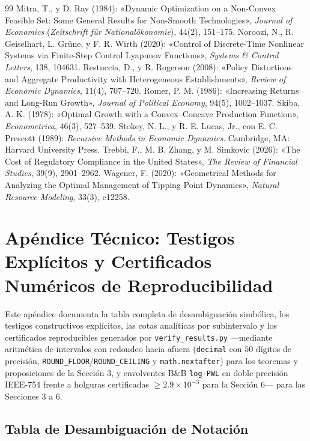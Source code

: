 \documentclass[11pt,letterpaper]{article}
\theoremstyle{plain}
\begin{document}
\begin{thebibliography}{99}
 Mitra, T., y D. Ray (1984): «Dynamic Optimization on a Non-Convex Feasible Set: Some General Results for Non-Smooth Technologies», \emph{Journal of Economics} (\emph{Zeitschrift für Nationalökonomie}), 44(2), 151--175.
 Noroozi, N., R. Geiselhart, L. Grüne, y F. R. Wirth (2020): «Control of Discrete-Time Nonlinear Systems via Finite-Step Control Lyapunov Functions», \emph{Systems \& Control Letters}, 138, 104631.
 Restuccia, D., y R. Rogerson (2008): «Policy Distortions and Aggregate Productivity with Heterogeneous Establishments», \emph{Review of Economic Dynamics}, 11(4), 707--720.
 Romer, P. M. (1986): «Increasing Returns and Long-Run Growth», \emph{Journal of Political Economy}, 94(5), 1002--1037.
 Skiba, A. K. (1978): «Optimal Growth with a Convex--Concave Production Function», \emph{Econometrica}, 46(3), 527--539.
 Stokey, N. L., y R. E. Lucas, Jr., con E. C. Prescott (1989): \emph{Recursive Methods in Economic Dynamics}. Cambridge, MA: Harvard University Press.
 Trebbi, F., M. B. Zhang, y M. Simkovic (2026): «The Cost of Regulatory Compliance in the United States», \emph{The Review of Financial Studies}, 39(9), 2901--2962.
 Wagener, F. (2020): «Geometrical Methods for Analyzing the Optimal Management of Tipping Point Dynamics», \emph{Natural Resource Modeling}, 33(3), e12258.
\end{thebibliography}

\clearpage
\appendix
\section{Apéndice Técnico: Testigos Explícitos y Certificados Numéricos de Reproducibilidad}

Este apéndice documenta la tabla completa de desambiguación simbólica, los testigos constructivos explícitos, las cotas analíticas por subintervalo y los certificados reproducibles generados por \texttt{verify\_results.py} ---mediante aritmética de intervalos con redondeo hacia afuera (\texttt{decimal} con $50$ dígitos de precisión, \texttt{ROUND\_FLOOR}/\texttt{ROUND\_CEILING} y \texttt{math.nextafter}) para los teoremas y proposiciones de la Sección 3, y envolventes B\&B \texttt{log-PWL} en doble precisión IEEE-754 frente a holguras certificadas $\ge 2.9\times 10^{-3}$ para la Sección 6--- para las Secciones 3 a 6.

\subsection{Tabla de Desambiguación de Notación}
\end{document}
